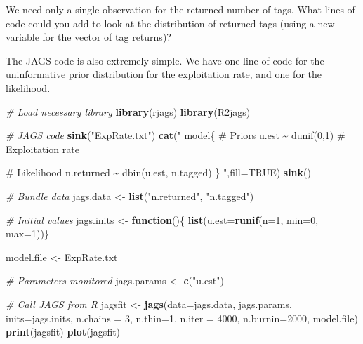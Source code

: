 \documentclass[
]{krantz}
\makeatletter
\newenvironment{Shaded}{\begin{snugshade}}{\end{snugshade}}
\newcommand{\AttributeTok}[1]{\textcolor[rgb]{0.27,0.27,0.27}{#1}}
\newcommand{\CommentTok}[1]{\textcolor[rgb]{0.37,0.37,0.37}{\textit{#1}}}
\newcommand{\ConstantTok}[1]{\textcolor[rgb]{0.37,0.37,0.37}{#1}}
\newcommand{\ControlFlowTok}[1]{\textcolor[rgb]{0.27,0.27,0.27}{\textbf{#1}}}
\newcommand{\DecValTok}[1]{\textcolor[rgb]{0.06,0.06,0.06}{#1}}
\newcommand{\FunctionTok}[1]{\textcolor[rgb]{0.27,0.27,0.27}{\textbf{#1}}}
\newcommand{\NormalTok}[1]{#1}
\newcommand{\OtherTok}[1]{\textcolor[rgb]{0.37,0.37,0.37}{#1}}
\newcommand{\StringTok}[1]{\textcolor[rgb]{0.5,0.5,0.5}{#1}}
\newenvironment{kframe}{%
\medskip{}
\setlength{\fboxsep}{.8em}
 \def\at@end@of@kframe{}%
 \ifinner\ifhmode%
  \def\at@end@of@kframe{\end{minipage}}%
  \begin{minipage}{\columnwidth}%
 \fi\fi%
 \def\FrameCommand##1{\hskip\@totalleftmargin \hskip-\fboxsep
 \colorbox{shadecolor}{##1}\hskip-\fboxsep
     \hskip-\linewidth \hskip-\@totalleftmargin \hskip\columnwidth}%
 \MakeFramed {\advance\hsize-\width
   \@totalleftmargin\z@ \linewidth\hsize
   \@setminipage}}%
 {\par\unskip\endMakeFramed%
 \at@end@of@kframe}
\renewenvironment{Shaded}{\begin{kframe}}{\end{kframe}}
\makeatother
\begin{document}
We need only a single observation for the returned number of tags. What lines of code could you add to look at the distribution of returned tags (using a new variable for the vector of tag returns)?

The JAGS code is also extremely simple. We have one line of code for the uninformative prior distribution for the exploitation rate, and one for the likelihood.

\begin{Shaded}
\begin{Highlighting}[]
\CommentTok{\# Load necessary library}
\FunctionTok{library}\NormalTok{(rjags)}
\FunctionTok{library}\NormalTok{(R2jags)}

\CommentTok{\# JAGS code}
\FunctionTok{sink}\NormalTok{(}\StringTok{"ExpRate.txt"}\NormalTok{)}
\FunctionTok{cat}\NormalTok{(}\StringTok{"}
\StringTok{model\{}
\StringTok{    \# Priors}
\StringTok{    u.est \textasciitilde{} dunif(0,1)  \# Exploitation rate}

\StringTok{    \# Likelihood}
\StringTok{    n.returned \textasciitilde{} dbin(u.est, n.tagged)}
\StringTok{\}}
\StringTok{    "}\NormalTok{,}\AttributeTok{fill=}\ConstantTok{TRUE}\NormalTok{)}
\FunctionTok{sink}\NormalTok{()}

\CommentTok{\# Bundle data}
\NormalTok{jags.data }\OtherTok{\textless{}{-}} \FunctionTok{list}\NormalTok{(}\StringTok{"n.returned"}\NormalTok{, }\StringTok{"n.tagged"}\NormalTok{)}

\CommentTok{\# Initial values}
\NormalTok{jags.inits }\OtherTok{\textless{}{-}} \ControlFlowTok{function}\NormalTok{()\{ }\FunctionTok{list}\NormalTok{(}\AttributeTok{u.est=}\FunctionTok{runif}\NormalTok{(}\AttributeTok{n=}\DecValTok{1}\NormalTok{, }\AttributeTok{min=}\DecValTok{0}\NormalTok{, }\AttributeTok{max=}\DecValTok{1}\NormalTok{))\}}

\NormalTok{model.file }\OtherTok{\textless{}{-}} \StringTok{\textquotesingle{}ExpRate.txt\textquotesingle{}}

\CommentTok{\# Parameters monitored}
\NormalTok{jags.params }\OtherTok{\textless{}{-}} \FunctionTok{c}\NormalTok{(}\StringTok{"u.est"}\NormalTok{)}

\CommentTok{\# Call JAGS from R}
\NormalTok{jagsfit }\OtherTok{\textless{}{-}} \FunctionTok{jags}\NormalTok{(}\AttributeTok{data=}\NormalTok{jags.data, jags.params, }\AttributeTok{inits=}\NormalTok{jags.inits,}
                \AttributeTok{n.chains =} \DecValTok{3}\NormalTok{, }\AttributeTok{n.thin=}\DecValTok{1}\NormalTok{, }\AttributeTok{n.iter =} \DecValTok{4000}\NormalTok{, }\AttributeTok{n.burnin=}\DecValTok{2000}\NormalTok{,}
\NormalTok{                model.file)}
\FunctionTok{print}\NormalTok{(jagsfit)}
\FunctionTok{plot}\NormalTok{(jagsfit)}
\end{Highlighting}
\end{Shaded}
\end{document}
